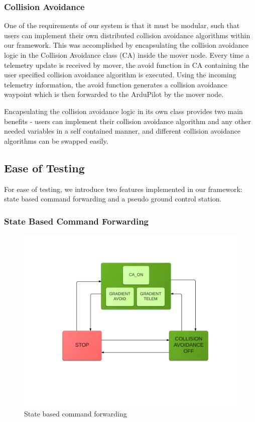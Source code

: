 \documentclass[conference]{IEEEtran}
\begin{document}
\subsubsection{Collision Avoidance}
One of the requirements of our system is that it must be modular, such that users can implement their own distributed collision avoidance algorithms within our framework. 
This was accomplished by encapsulating the collision avoidance logic in the Collision Avoidance class (CA) inside the mover node. Every time a telemetry update is received by mover, the avoid function in CA containing the user specified collision avoidance algorithm is executed. Using the incoming telemetry information, the avoid function generates a collision avoidance waypoint which is then forwarded to the ArduPilot by the mover node.

Encapsulating the collision avoidance logic in its own class provides two main benefits -  users can implement their collision avoidance algorithm and any other needed variables in a self contained manner, and different collision avoidance algorithms can be swapped easily. 

\subsection{Ease of Testing}

For ease of testing, we introduce two features implemented in our framework: state based command forwarding and a pseudo ground control station.
\subsubsection{State Based Command Forwarding}
\label{sec:statebased}

\begin{figure}  [h]
  \includegraphics [width=1\columnwidth] {stateDiagramv2}
  \caption{State based command forwarding}
  \label{fig:statebased}
\end{figure}
\end{document}
